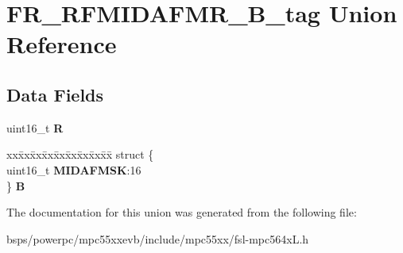 \hypertarget{unionFR__RFMIDAFMR__16B__tag}{}\section{F\+R\+\_\+\+R\+F\+M\+I\+D\+A\+F\+M\+R\+\_\+B\+\_\+tag Union Reference}
\label{unionFR__RFMIDAFMR__16B__tag}
\subsection*{Data Fields}
\begin{DoxyCompactItemize}
\item 
\mbox{\label{unionFR__RFMIDAFMR__16B__tag_abc314c44cdba441613a50db287ef20ea}} 
uint16\+\_\+t {\bfseries R}
\item 
\mbox{\label{unionFR__RFMIDAFMR__16B__tag_af00665043e544f5fea681ee50b1e886e}} 
\begin{tabbing}
xx\=xx\=xx\=xx\=xx\=xx\=xx\=xx\=xx\=\kill
struct \{\\
\>uint16\_t {\bfseries MIDAFMSK}:16\\
\} {\bfseries B}\\

\end{tabbing}\end{DoxyCompactItemize}


The documentation for this union was generated from the following file\+:\begin{DoxyCompactItemize}
\item 
bsps/powerpc/mpc55xxevb/include/mpc55xx/fsl-\/mpc564x\+L.\+h\end{DoxyCompactItemize}
